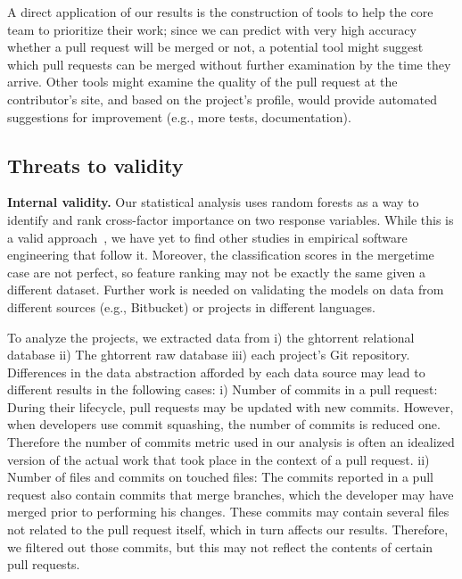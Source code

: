 \documentclass{sig-alternate}
\begin{document}

A direct application of our results is the construction of tools to help the core team to prioritize their work; since we can predict
with very high accuracy whether a pull request will be merged or not, a
potential tool might suggest which pull requests can be merged without further
examination by the time they arrive. Other tools might examine the quality of
the pull request at the contributor's site, and based on the project's
profile, would provide automated suggestions for improvement (e.g., more tests,
documentation). 

\subsection{Threats to validity}

\textbf{Internal validity.} Our statistical analysis uses random forests as a way
to identify and rank cross-factor importance on two response variables. While
this is a valid approach~\cite{Genue10}, we have yet to find other studies in
empirical software engineering that follow it. Moreover, the classification
scores in the \textsf{mergetime} case are not perfect, so feature ranking may
not be exactly the same given a different dataset. Further work is needed on
validating the models on data from different sources (e.g., Bitbucket) or projects in different languages. 

To analyze the projects, we extracted data from i) the {\sc ght}orrent relational
database ii) The {\sc ght}orrent raw database iii) each project's Git repository.
Differences in the data abstraction afforded by each data source may
lead to different results in the following cases: 
i) Number of commits in a pull request: During their lifecycle, pull requests
may be updated with new commits. However, when developers use commit squashing,
the number of commits is reduced one. Therefore the number of commits metric
used in our analysis is often an idealized version of the actual work
that took place in the context of a pull request.
ii) Number of files and commits on touched files: The commits reported
in a pull request also contain commits that merge branches, which the
developer may have merged prior to performing his changes. These commits
may contain several files not related to the pull request itself, which
in turn affects our results. Therefore, we  
filtered out those commits, but this may not reflect the contents of 
certain pull requests.
\end{document}
